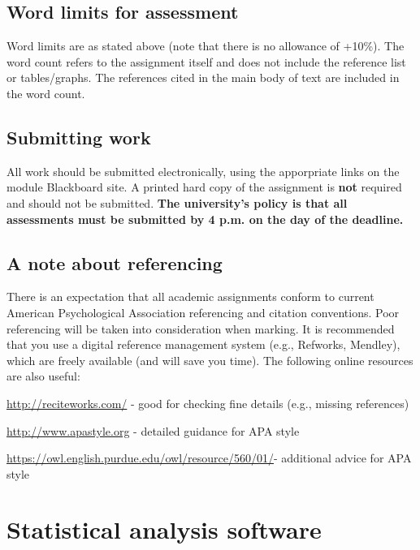 \documentclass[
]{book}
\begin{document}
\hypertarget{word-limits-for-assessment}{%
\subsection{Word limits for assessment}\label{word-limits-for-assessment}}

Word limits are as stated above (note that there is no allowance of +10\%). The word count refers to the assignment itself and does not include the reference list or tables/graphs. The references cited in the main body of text are included in the word count.

\hypertarget{submitting-work}{%
\subsection{Submitting work}\label{submitting-work}}

All work should be submitted electronically, using the apporpriate links on the module Blackboard site. A printed hard copy of the assignment is \textbf{not} required and should not be submitted. \textbf{The university's policy is that all assessments must be submitted by 4 p.m. on the day of the deadline.}

\hypertarget{a-note-about-referencing}{%
\subsection{A note about referencing}\label{a-note-about-referencing}}

There is an expectation that all academic assignments conform to current American Psychological Association referencing and citation conventions. Poor referencing will be taken into consideration when marking. It is recommended that you use a digital reference management system (e.g., Refworks, Mendley), which are freely available (and will save you time). The following online resources are also useful:

\url{http://reciteworks.com/} - good for checking fine details (e.g., missing references)

\url{http://www.apastyle.org} - detailed guidance for APA style

\url{https://owl.english.purdue.edu/owl/resource/560/01/}- additional advice for APA style

\hypertarget{statistical-analysis-software}{%
\section{Statistical analysis software}\label{statistical-analysis-software}}
\end{document}

